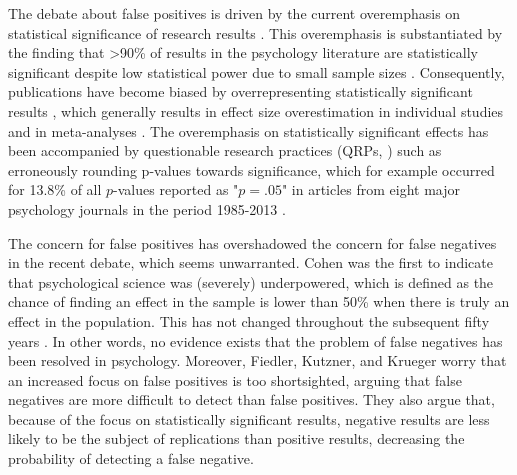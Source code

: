\documentclass{article}
\begin{document}
The debate about false positives is driven by the current overemphasis on statistical significance of research results \cite{Giner-Sorolla2012-wn}. This overemphasis is substantiated by the finding that >90\% of results in the psychology literature are statistically significant \cite{Open_Science_Collaboration2015-zs,Sterling1995-fe,Sterling1959-pf} despite low statistical power due to small sample sizes \cite{Cohen1962-jc,Sedlmeier1989-yc,Marszalek2011-rf,Bakker2012-tf}. Consequently, publications have become biased by overrepresenting statistically significant results \cite{Greenwald1975-ck}, which generally results in effect size overestimation in individual studies \cite{Nuijten2015-od} and in meta-analyses \cite{Van_Assen2015-gg,Lane_1978,Rothstein2005-zg,Borenstein2009-vs}. The overemphasis on statistically significant effects has been accompanied by questionable research practices (QRPs, \cite{John2012-uj}) such as erroneously rounding p-values towards significance, which for example occurred for 13.8\% of all $p$-values reported as "$p =.05$" in articles from eight major psychology journals in the period 1985-2013 \cite{Hartgerink2016-mm}.

The concern for false positives has overshadowed the concern for false negatives in the recent debate, which seems unwarranted. Cohen \cite{Cohen1962-jc} was the first to indicate that psychological science was (severely) underpowered, which is defined as the chance of finding an effect in the sample is lower than 50\% when there is truly an effect in the population. This has not changed throughout the subsequent fifty years \cite{Bakker2012-tf,Fraley2014-xs}. In other words, no evidence exists that the problem of false negatives has been resolved in psychology. Moreover, Fiedler, Kutzner, and Krueger \cite{Fiedler2012-gx} worry that an increased focus on false positives is too shortsighted, arguing that false negatives are more difficult to detect than false positives. They also argue that, because of the focus on statistically significant results, negative results are less likely to be the subject of replications than positive results, decreasing the probability of detecting a false negative.
\end{document}

